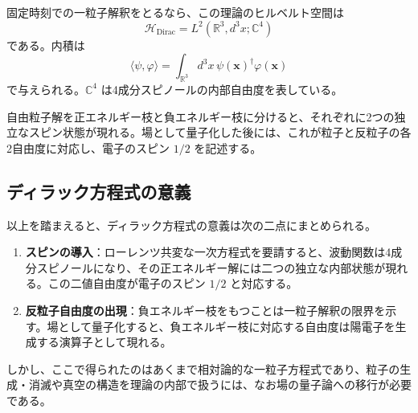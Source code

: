 固定時刻での一粒子解釈をとるなら、この理論のヒルベルト空間は
\[
\mathcal{H}_{\mathrm{Dirac}}
=
L^2(\mathbb{R}^3,d^3x;\mathbb{C}^4)
\]
である。内積は
\[
\langle \psi,\varphi \rangle
=
\int_{\mathbb{R}^3} d^3x\, \psi(\mathbf{x})^\dagger \varphi(\mathbf{x})
\]
で与えられる。$\mathbb{C}^4$ は4成分スピノールの内部自由度を表している。

自由粒子解を正エネルギー枝と負エネルギー枝に分けると、それぞれに2つの独立なスピン状態が現れる。場として量子化した後には、これが粒子と反粒子の各2自由度に対応し、電子のスピン $1/2$ を記述する。

\subsection{ディラック方程式の意義}
以上を踏まえると、ディラック方程式の意義は次の二点にまとめられる。
\begin{enumerate}
    \item \textbf{スピンの導入}：ローレンツ共変な一次方程式を要請すると、波動関数は4成分スピノールになり、その正エネルギー解には二つの独立な内部状態が現れる。この二値自由度が電子のスピン $1/2$ と対応する。
    \item \textbf{反粒子自由度の出現}：負エネルギー枝をもつことは一粒子解釈の限界を示す。場として量子化すると、負エネルギー枝に対応する自由度は陽電子を生成する演算子として現れる。
\end{enumerate}
しかし、ここで得られたのはあくまで相対論的な一粒子方程式であり、粒子の生成・消滅や真空の構造を理論の内部で扱うには、なお場の量子論への移行が必要である。
